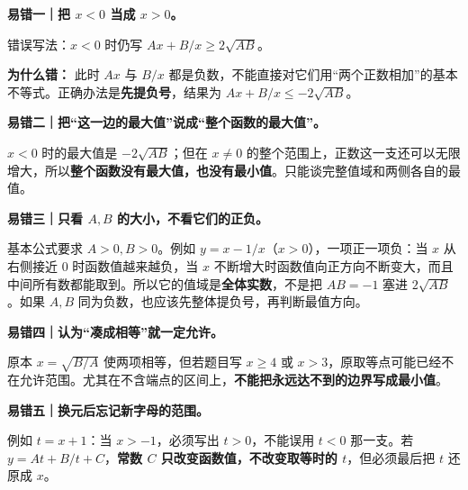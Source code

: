 \clearpage
\begin{trapbox}
\textbf{易错一｜把 $x<0$ 当成 $x>0$。}

错误写法：$x<0$ 时仍写 $Ax+B/x\ge2\sqrt{AB}$。

\textbf{为什么错：} 此时 $Ax$ 与 $B/x$ 都是负数，不能直接对它们用“两个正数相加”的基本不等式。正确办法是\textbf{先提负号}，结果为 $Ax+B/x\le-2\sqrt{AB}$。

\medskip
\textbf{易错二｜把“这一边的最大值”说成“整个函数的最大值”。}

$x<0$ 时的最大值是 $-2\sqrt{AB}$；但在 $x\ne0$ 的整个范围上，正数这一支还可以无限增大，所以\textbf{整个函数没有最大值，也没有最小值}。只能谈完整值域和两侧各自的最值。

\medskip
\textbf{易错三｜只看 $A,B$ 的大小，不看它们的正负。}

基本公式要求 $A>0,B>0$。例如 $y=x-1/x$（$x>0$），一项正一项负：当 $x$ 从右侧接近 $0$ 时函数值越来越负，当 $x$ 不断增大时函数值向正方向不断变大，而且中间所有数都能取到。所以它的值域是\textbf{全体实数}，不是把 $AB=-1$ 塞进 $2\sqrt{AB}$。如果 $A,B$ 同为负数，也应该先整体提负号，再判断最值方向。

\medskip
\textbf{易错四｜认为“凑成相等”就一定允许。}

原本 $x=\sqrt{B/A}$ 使两项相等，但若题目写 $x\ge4$ 或 $x>3$，原取等点可能已经不在允许范围。尤其在不含端点的区间上，\textbf{不能把永远达不到的边界写成最小值}。

\medskip
\textbf{易错五｜换元后忘记新字母的范围。}

例如 $t=x+1$：当 $x>-1$，必须写出 $t>0$，不能误用 $t<0$ 那一支。若 $y=At+B/t+C$，\textbf{常数 $C$ 只改变函数值，不改变取等时的 $t$}，但必须最后把 $t$ 还原成 $x$。

\medskip
\end{trapbox}
\clearpage
